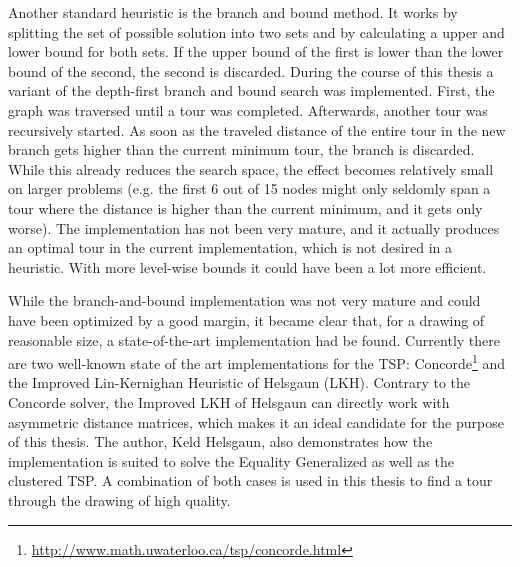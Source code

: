 Another standard heuristic is the branch and bound method. It works by splitting the set of possible solution into two sets and by calculating a upper and lower bound for both sets. If the upper bound of the first is lower than the lower bound of the second, the second is discarded. During the course of this thesis a variant of the depth-first branch and bound search was implemented. First, the graph was traversed until a tour was completed. Afterwards, another tour was recursively started. As soon as the traveled distance of the entire tour in the new branch gets higher than the current minimum tour, the branch is discarded. While this already reduces the search space, the effect becomes relatively small on larger problems (e.g. the first 6 out of 15 nodes might only seldomly span a tour where the distance is higher than the current minimum, and it gets only worse). The implementation has not been very mature, and it actually produces an optimal tour in the current implementation, which is not desired in a heuristic. With more level-wise bounds it could have been a lot more efficient. 

While the branch-and-bound implementation was not very mature and could have been optimized by a good margin, it became clear that, for a drawing of reasonable size, a state-of-the-art implementation had be found. Currently there are two well-known state of the art implementations for the TSP: Concorde\footnote{\url{http://www.math.uwaterloo.ca/tsp/concorde.html}} and the Improved Lin-Kernighan Heuristic of Helsgaun (LKH)\cite{helsgaun2000effective}\cite{kernighan1970efficient}. Contrary to the Concorde solver, the Improved LKH of Helsgaun can directly work with asymmetric distance matrices, which makes it an ideal candidate for the purpose of this thesis.
The author, Keld Helsgaun, also demonstrates how the implementation is suited to solve the Equality Generalized\citep{helsgaun2013equality} as well as the clustered TSP\cite{helsgaun2014solving}. A combination of both cases is used in this thesis to find a tour through the drawing of high quality.

